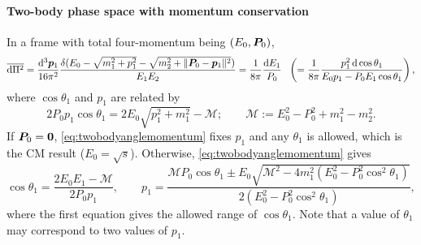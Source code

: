 \documentclass[CheatSheet]{subfiles}
\begin{document}
\paragraph{Two-body phase space with momentum conservation}
In a frame with total four-momentum being $(E_0,{\boldsymbol{P}}_0)$,
\begin{equation}
\overline{\mathop{}\!\mathrm{d}\Pi^2}
=\frac{\mathop{}\!\mathrm{d}^3{\boldsymbol{p}}_1}{16\pi^2}\frac{\delta(E_0-\sqrt{m_1^2+p_1^2}-\sqrt{m_2^2+\|{\boldsymbol{P}}_0-{\boldsymbol{p}}_1\|^2})}{E_1E_2}
=\frac{1}{8\pi}\frac{\mathop{}\!\mathrm{d} E_1}{P_0}
~~\left(=\frac{1}{8\pi}\frac{p_1^2\mathop{}\!\mathrm{d}\cos\theta_{1}}{E_0p_1-P_0E_1\cos\theta_1}\right),
\label{eq:twobodypsgeneral}
\end{equation}
where $\cos\theta_1$ and $p_1$ are related by
\begin{equation}
 2P_0 p_1\cos\theta_1 = 2E_0 \sqrt{p_1^2+m_1^2}-\mathcal M;
\qquad \mathcal M := E_0^2 - P_0^2 +  m_1^2 - m_2^2.
\label{eq:twobodyanglemomentum}
\end{equation}
If ${\boldsymbol{P}}_0={\boldsymbol{0}}$, \cref{eq:twobodyanglemomentum} fixes $p_1$ and any $\theta_1$ is allowed, which is the CM result ($E_0=\sqrt s$).
Otherwise, \cref{eq:twobodyanglemomentum} gives
\begin{equation}
 \cos\theta_1 = \frac{2E_0E_1-\mathcal M}{2P_0p_1},\qquad
p_1=\frac{\mathcal MP_0\cos\theta_1
 \pm E_0\sqrt{\mathcal M^2-4m_1^2(E_0^2-P_0^2\cos^2\theta_1)}
}{2(E_0^2-P_0^2\cos^2\theta_1)},
\end{equation}
where the first equation gives the allowed range of $\cos\theta_1$.
Note that a value of $\theta_1$ may correspond to two values of $p_1$.
\end{document}
